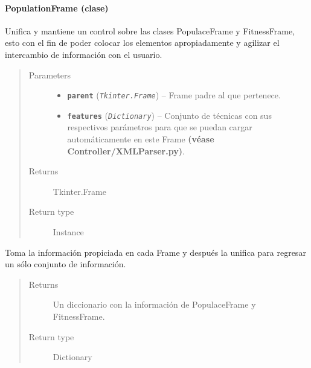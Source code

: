 \documentclass[class=report, crop=false]{standalone}
\begin{document}
\paragraph{PopulationFrame (clase)}
\label{sec:a_3_2_4_1}

\begin{fulllineitems}

\begin{DUlineblock}{0em}
\item[] Unifica y mantiene un control sobre las clases 
PopulaceFrame y FitnessFrame, esto con el fin de poder 
colocar los elementos apropiadamente y agilizar el 
intercambio de información con el usuario.
\end{DUlineblock}

\begin{quote}\begin{description}
\item[{Parameters}] \leavevmode\begin{itemize}
\item \textbf{\texttt{parent}} (\emph{\texttt{Tkinter.Frame}}) -- Frame padre al que pertenece.
\item \textbf{\texttt{features}} (\emph{\texttt{Dictionary}}) -- Conjunto de técnicas con sus respectivos parámetros para que se puedan cargar automáticamente en este Frame \textbf{(véase Controller/XMLParser.py)}.
\end{itemize}

\item[{Returns}] \leavevmode
Tkinter.Frame
\item[{Return type}] \leavevmode
Instance
\end{description}\end{quote}


\begin{fulllineitems}

Toma la información propiciada en cada Frame y después
la unifica para regresar un sólo conjunto de información.

\begin{quote}\begin{description}
\item[{Returns}] \leavevmode
Un diccionario con la información de PopulaceFrame y FitnessFrame.
\item[{Return type}] \leavevmode
Dictionary
\end{description}\end{quote}


\end{fulllineitems}
\end{fulllineitems}
\end{document}
